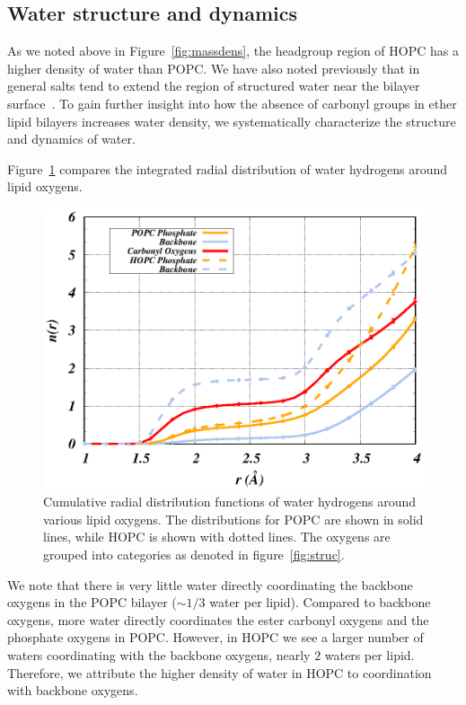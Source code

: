 \documentclass[12pt,preprint,times,openany,draft]{book}
\newcommand{\about}{$\sim$}
\begin{document}
\subsection{Water structure and dynamics}
As we noted above in Figure~\ref{fig:massdens}, the headgroup region of HOPC has a higher density of water than 
POPC. We have also noted previously that in 
general salts tend to extend the region of structured water near the bilayer surface~\cite{kruczek:2017}. 
To gain further insight into how the absence of carbonyl groups in ether lipid bilayers increases water density, we systematically characterize the structure and dynamics of water.  


Figure~\ref{fig:hrdf} compares the integrated radial distribution of water hydrogens around lipid oxygens. 

\begin{figure}
\caption{ 
Cumulative radial distribution functions of water hydrogens around
various lipid oxygens. The distributions for POPC are shown in solid lines, while HOPC is shown with dotted lines. The oxygens are grouped into categories as denoted in figure~\ref{fig:struc}.}
\label{fig:hrdf}
\includegraphics[width=\textwidth]{h_rdf_cum.eps}
\end{figure}
We note that there is very little water directly coordinating the backbone oxygens in the POPC bilayer (\about $1/3$ water per lipid). 
Compared to backbone oxygens, more water directly coordinates the ester carbonyl oxygens and the phosphate oxygens in POPC. 
However, in HOPC we see
a larger number of waters coordinating with the backbone oxygens, nearly $2$ waters per lipid.
Therefore, we attribute the higher density of water in HOPC to coordination with backbone oxygens. 
\end{document}
